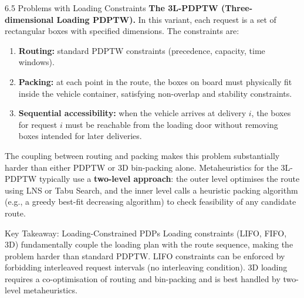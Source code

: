 \documentclass[aspectratio=169,10pt]{beamer}
\begin{document}
\begin{frame}[allowframebreaks]{6.5 Problems with Loading Constraints}
  \textbf{The 3L-PDPTW (Three-dimensional Loading PDPTW).}  In this variant, each
  request is a set of rectangular boxes with specified dimensions. The constraints are:
  \begin{enumerate}
    \item \textbf{Routing:} standard PDPTW constraints (precedence, capacity, time windows).
    \item \textbf{Packing:} at each point in the route, the boxes on board must physically
          fit inside the vehicle container, satisfying non-overlap and stability constraints.
    \item \textbf{Sequential accessibility:} when the vehicle arrives at delivery $i$,
          the boxes for request $i$ must be reachable from the loading door without
          removing boxes intended for later deliveries.
  \end{enumerate}

  The coupling between routing and packing makes this problem substantially harder than
  either PDPTW or 3D bin-packing alone. Metaheuristics for the 3L-PDPTW typically use
  a \textbf{two-level approach}: the outer level optimises the route using LNS or Tabu
  Search, and the inner level calls a heuristic packing algorithm (e.g., a greedy
  best-fit decreasing algorithm) to check feasibility of any candidate route.

  \begin{alertblock}{Key Takeaway: Loading-Constrained PDPs}
    Loading constraints (LIFO, FIFO, 3D) fundamentally couple the loading plan with
    the route sequence, making the problem harder than standard PDPTW. LIFO constraints
    can be enforced by forbidding interleaved request intervals (no interleaving condition).
    3D loading requires a co-optimisation of routing and bin-packing and is best
    handled by two-level metaheuristics.
  \end{alertblock}

\end{frame}
\end{document}
